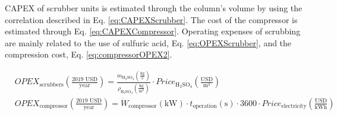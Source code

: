 \begin{refsection}[referencesCh6]
%

CAPEX of scrubber units is estimated through the column's volume by using the correlation described in Eq. \ref{eq:CAPEXScrubber}. The cost of the compressor is estimated through Eq. \ref{eq:CAPEXCompressor}.
Operating expenses of scrubbing are mainly related to the use of sulfuric acid, Eq. \ref{eq:OPEXScrubber}, and the compression cost, Eq. \ref{eq:compressorOPEX2}.

\begin{align}
& OPEX_{\text{scrubbers}} \left(\frac{\text{2019 USD}}{\text{year}}\right) = \frac{\dot{m}_{\text{H}_2 \text{SO}_4} \left(\frac{\text{kg}}{\text{s}}\right)}{\rho_{\text{H}_2 \text{SO}_4} \left(\frac{\text{kg}}{\text{m}^3}\right)} \cdot Price_{\text{H}_2 \text{SO}_4} \left(\frac{\text{USD}}{\text{m}^3}\right)  \label{eq:OPEXScrubber}
\\
& OPEX_{\text{compressor}} \left(\frac{\text{2019 USD}}{\text{year}}\right) = \dot{W}_{\text{compressor}} \left(\text{kW}\right) \cdot t_{\text{operation}} \left(\text{s}\right) \cdot 3600 \cdot Price_{\text{electricity}}\left(\frac{\text{USD}}{\text{kWh}}\right) \label{eq:compressorOPEX2}
\end{align}	


\end{refsection}

